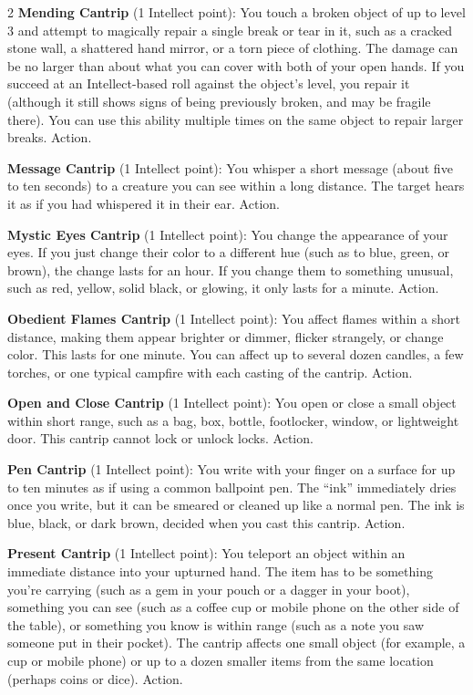 \begin{multicols}{2}
\textbf{Mending Cantrip} (1 Intellect point): You touch a broken object of up to level 3 and attempt to magically repair a single break or tear in it, such as a cracked stone wall, a shattered hand mirror, or a torn piece of clothing. The damage can be no larger than about what you can cover with both of your open hands. If you succeed at an Intellect-based roll against the object’s level, you repair it (although it still shows signs of being previously broken, and may be fragile there). You can use this ability multiple times on the same object to repair larger breaks. Action. 

\textbf{Message Cantrip} (1 Intellect point): You whisper a short message (about five to ten seconds) to a creature you can see within a long distance. The target hears it as if you had whispered it in their ear. Action. 

\textbf{Mystic Eyes Cantrip} (1 Intellect point): You change the appearance of your eyes. If you just change their color to a different hue (such as to blue, green, or brown), the change lasts for an hour. If you change them to something unusual, such as red, yellow, solid black, or glowing, it only lasts for a minute. Action.

\textbf{Obedient Flames Cantrip} (1 Intellect point): You affect flames within a short distance, making them appear brighter or dimmer, flicker strangely, or change color. This lasts for one minute. You can affect up to several dozen candles, a few torches, or one typical campfire with each casting of the cantrip. Action. 

\textbf{Open and Close Cantrip} (1 Intellect point): You open or close a small object within short range, such as a bag, box, bottle, footlocker, window, or lightweight door. This cantrip cannot lock or unlock locks. Action. 

\textbf{Pen Cantrip} (1 Intellect point): You write with your finger on a surface for up to ten minutes as if using a common ballpoint pen. The “ink” immediately dries once you write, but it can be smeared or cleaned up like a normal pen. The ink is blue, black, or dark brown, decided when you cast this cantrip. Action. 

\textbf{Present Cantrip} (1 Intellect point): You teleport an object within an immediate distance into your upturned hand. The item has to be something you’re carrying (such as a gem in your pouch or a dagger in your boot), something you can see (such as a coffee cup or mobile phone on the other side of the table), or something you know is within range (such as a note you saw someone put in their pocket). The cantrip affects one small object (for example, a cup or mobile phone) or up to a dozen smaller items from the same location (perhaps coins or dice). Action. 


\end{multicols}
